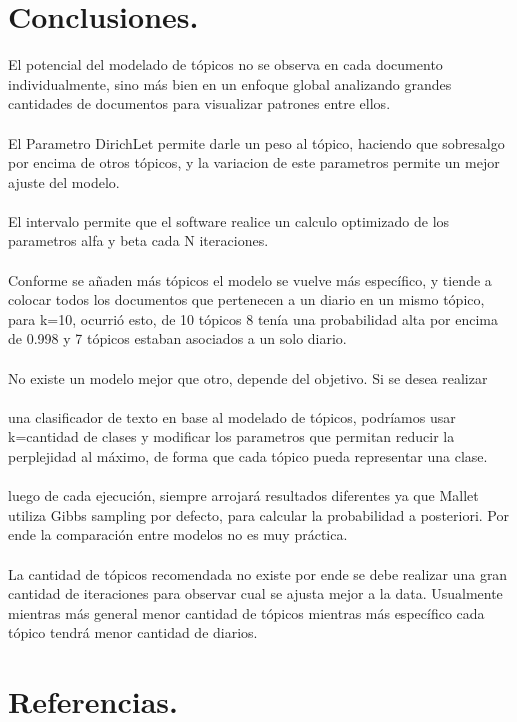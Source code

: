 \documentclass[8.5pt,twoside,twocolumn]{article}
\begin{document}
\section{Conclusiones.}
El potencial del modelado de t\'opicos no se observa en cada 
documento individualmente, sino m\'as bien en un enfoque global analizando 
grandes cantidades de documentos para visualizar patrones entre ellos. 
\\
\\
El Parametro DirichLet permite darle un peso al t\'opico, haciendo 
que sobresalgo por encima de otros t\'opicos, y la variacion de este 
parametros permite un mejor ajuste del modelo.
\\
\\
El intervalo permite que el software realice un calculo optimizado de los parametros alfa y beta cada N iteraciones.
\\
\\
Conforme se a\~naden m\'as t\'opicos el modelo se vuelve m\'as espec\'ifico, y tiende a colocar todos los documentos que pertenecen a un diario en un mismo t\'opico, para k=10, ocurri\'o esto, de 10 t\'opicos 8 ten\'ia una probabilidad alta por encima de 0.998 y 7 t\'opicos estaban asociados a un solo diario.
\\
\\
No existe un modelo mejor que otro, depende del objetivo. Si se desea realizar
\\
\\
 una clasificador de texto en base al modelado de t\'opicos, 
podr\'iamos usar k=cantidad de clases y modificar los parametros que permitan 
reducir la perplejidad al m\'aximo, de forma que cada t\'opico pueda representar una clase.
\\
\\
luego de cada ejecuci\'on, siempre arrojar\'a resultados diferentes ya que Mallet utiliza Gibbs sampling por defecto, para calcular la probabilidad a posteriori. Por ende la comparaci\'on entre modelos no es muy pr\'actica.
\\
\\
La cantidad de t\'opicos recomendada no existe por ende se debe realizar una gran cantidad de iteraciones para observar cual se ajusta mejor a la data. Usualmente mientras m\'as general menor cantidad de t\'opicos mientras m\'as espec\'ifico cada t\'opico tendr\'a menor cantidad de diarios.

\section{Referencias.}
\end{document}

